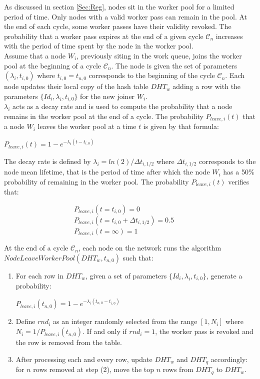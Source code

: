 As discussed in section \ref{Sec:Reg}, nodes sit in the worker pool for a limited period of time. Only nodes with a valid worker pass can remain in the pool. At the end of each cycle, some worker passes have their validity revoked. The probability that a worker pass expires at the end of a given cycle $\mathcal{C}_n$ increases with the period of time spent by the node in the worker pool. \\

Assume that a node $W_i$, previously siting in the work queue, joins the worker pool at the beginning of a cycle $\mathcal{C}_n$. The node is given the set of parameters $(\lambda_i, t_{i,0})$ where $t_{i,0}=t_{n,0}$ corresponds to the beginning of the cycle $\mathcal{C}_n$. Each node updates their local copy of the hash table $DHT_w$ adding a row with the parameters $\{Id_i, \lambda_i, t_{i,0}\}$ for the new joiner $W_i$.\\

$\lambda_i$ acts as a decay rate and is used to compute the probability that a node remains in the worker pool at the end of a cycle. The probability $P_{leave,i}(t)$ that a node $W_i$ leaves the worker pool at a time $t$ is given by that formula:
\begin{center}
$P_{leave,i}(t) = 1 - e^{-\lambda_i(t-t_{i,0})}$
\end{center}
The decay rate is defined by  $\lambda_i = ln(2)/\Delta t_{i,1/2}$ where $\Delta t_{i,1/2}$ corresponds to the node mean lifetime, that is the period of time after which the node $W_i$ has a 50\% probability of remaining in the worker pool. The probability $P_{leave,i}(t)$ verifies that:
\begin{flushleft}
~~~~~~~~~~~~~~~~~~~~$P_{leave,i}(t = t_{i,0}) = 0$\\
~~~~~~~~~~~~~~~~~~~~$P_{leave,i}(t = t_{i,0} + \Delta t_{i,1/2}) = 0.5$\\
~~~~~~~~~~~~~~~~~~~~$P_{leave,i}(t = \infty) = 1$
\end{flushleft}
 
At the end of a cycle $\mathcal{C}_n$, each node on the network runs the algorithm\\ $NodeLeaveWorkerPool(DHT_w,t_{n,0})$ such that:
\begin{enumerate}
\item For each row in $DHT_w$, given a set of parameters $\{Id_i, \lambda_i, t_{i,0}\}$, generate a probability:
\begin{center}
$P_{leave,i}(t_{n,0}) = 1 - e^{-\lambda_i(t_{n,0}-t_{i,0})}$
\end{center}
\item Define $rnd_i$ as an integer randomly selected from the range $[1, N_i]$ where $N_i = 1/P_{leave,i}(t_{n,0})$. If and only if $rnd_i = 1$, the worker pass is revoked and the row is removed from the table.
\item After processing each and every row, update $DHT_w$ and $DHT_q$ accordingly: for $n$ rows removed at step (2), move the top $n$ rows from $DHT_q$ to $DHT_w$. 
\end{enumerate}
